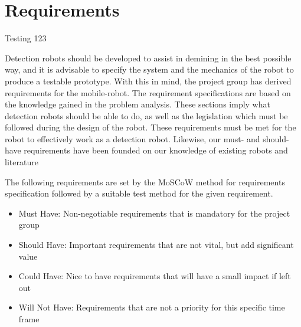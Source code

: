 
\chapter{Requirements}

Testing 123

Detection robots should be developed to assist in demining in the best possible way, and it is advisable to specify the system and the mechanics of the robot to produce a testable prototype. With this in mind, the project group has derived requirements for the mobile-robot. The requirement specifications are based on the knowledge gained in the problem analysis. These sections imply what detection robots should be able to do, as well as the legislation which must be followed during the design of the robot. These requirements must be met for the robot to effectively work as a detection robot. Likewise, our must- and should-have requirements have been founded on our knowledge of existing robots and literature\\

        \vspace{2mm}

The following requirements are set by the MoSCoW method for requirements specification followed by a suitable test method for the given requirement.

\begin{itemize}[label={}]
\setlength{\itemsep}{0.05\baselineskip}
    \item {} \normalsize Must Have: \hspace{5mm} Non-negotiable requirements that is mandatory for the project group \par
    \item {} \normalsize Should Have: \hspace{1.8mm} Important requirements that are not vital, but add significant value \par
    \item {} \normalsize Could Have: \hspace{3.5mm} Nice to have requirements that will have a small impact if left out \par
    \item {} \normalsize Will Not Have: Requirements that are not a priority for this specific time frame \par
\end{itemize}

